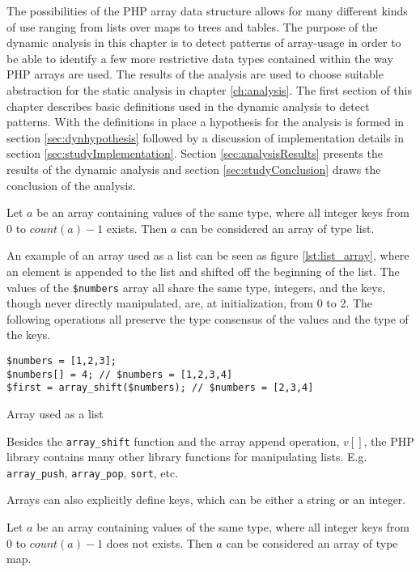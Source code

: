 The possibilities of the PHP array data structure allows for many different kinds of use ranging from lists over maps to trees and tables. The purpose of the dynamic analysis in this chapter is to detect patterns of array-usage in order to be able to identify a few more restrictive data types contained within the way PHP arrays are used. The results of the analysis are used to choose suitable abstraction for the static analysis in chapter \ref{ch:analysis}. The first section of this chapter describes basic definitions used in the dynamic analysis to detect patterns. With the definitions in place a hypothesis for the analysis is formed in section \ref{sec:dynhypothesis} followed by a discussion of implementation details in section \ref{sec:studyImplementation}. Section \ref{sec:analysisResults} presents the results of the dynamic analysis and section \ref{sec:studyConclusion} draws the conclusion of the analysis.

\begin{definition}
Let $a$ be an array containing values of the same type, where all integer keys from 0 to $count(a)-1$ exists. Then $a$ can be considered an array of type list.
\end{definition}

An example of an array used as a list can be seen as figure \ref{lst:list_array}, where an element is appended to the list and shifted off the beginning of the list. The values of the \texttt{\$numbers} array all share the same type, integers, and the keys, though never directly manipulated, are, at initialization, from 0 to 2. The following operations all preserve the type consensus of the values and the type of the keys. 

\begin{program}[ht]
\begin{lstlisting}
$numbers = [1,2,3];
$numbers[] = 4; // $numbers = [1,2,3,4]
$first = array_shift($numbers); // $numbers = [2,3,4]
\end{lstlisting}
\caption{Array used as a list}
\label{lst:list_array}
\end{program}

Besides the \texttt{array\_shift} function and the array append operation, $v[]$, the PHP library contains many other library functions for manipulating lists. E.g. \texttt{array\_push}, \texttt{array\_pop}, \texttt{sort}, etc.

Arrays can also explicitly define keys, which can be either a string or an integer. 

\begin{definition}
Let $a$ be an array containing values of the same type, where all integer keys from 0 to $count(a)-1$ does not exists. Then $a$ can be considered an array of type map.
\end{definition}

